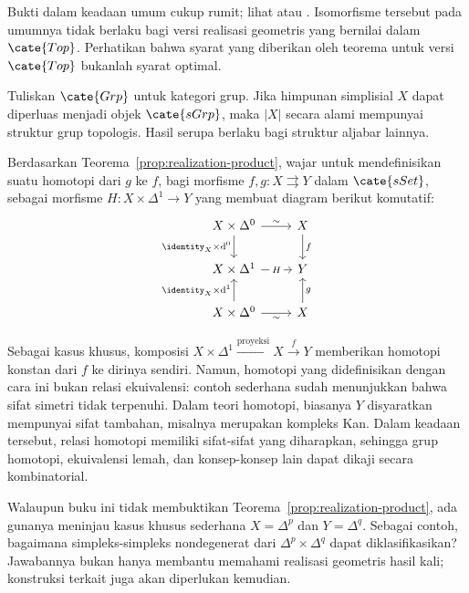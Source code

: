 Bukti dalam keadaan umum cukup rumit; lihat \cite[Bab III]{GZ67} atau
\cite{Dri03}. Isomorfisme tersebut pada umumnya tidak berlaku bagi versi
realisasi geometris yang bernilai dalam $\cate{Top}$. Perhatikan bahwa syarat
yang diberikan oleh teorema untuk versi $\cate{Top}$ bukanlah syarat optimal.

\begin{corollary}
	Tuliskan $\cate{Grp}$ untuk kategori grup. Jika himpunan simplisial $X$
	dapat diperluas menjadi objek $\cate{sGrp}$, maka $|X|$ secara alami
	mempunyai struktur grup topologis. Hasil serupa berlaku bagi struktur
	aljabar lainnya.
\end{corollary}

Berdasarkan Teorema~\ref{prop:realization-product}, wajar untuk mendefinisikan
suatu homotopi dari $g$ ke $f$, bagi morfisme
$f,g:X\rightrightarrows Y$ dalam $\cate{sSet}$, sebagai morfisme
$H:X\times\Delta^1\to Y$ yang membuat diagram berikut komutatif:
\begin{equation}\label{eqn:simplicial-homotopy-prep}
	\begin{tikzcd}
		X \times \Delta^0 \arrow[d, "{\identity_X \times \mathrm{d}^0}"'] \arrow[r, "\sim"] & X \arrow[d, "f"] \\
		X \times \Delta^1 \arrow[r, "H" description] & Y \\
		X \times \Delta^0 \arrow[u, "{\identity_X \times \mathrm{d}^1}"] \arrow[r, "\sim"'] & X \arrow[u, "g"']
	\end{tikzcd}
\end{equation}

Sebagai kasus khusus, komposisi
$X\times\Delta^1\xrightarrow{\text{proyeksi}}X\xrightarrow{f}Y$
memberikan homotopi konstan dari $f$ ke dirinya sendiri. Namun, homotopi yang
didefinisikan dengan cara ini bukan relasi ekuivalensi: contoh sederhana
sudah menunjukkan bahwa sifat simetri tidak terpenuhi. Dalam teori homotopi,
biasanya $Y$ disyaratkan mempunyai sifat tambahan, misalnya merupakan
kompleks Kan. Dalam keadaan tersebut, relasi homotopi memiliki
sifat-sifat yang diharapkan, sehingga grup homotopi, ekuivalensi lemah, dan
konsep-konsep lain dapat dikaji secara kombinatorial.

Walaupun buku ini tidak membuktikan
Teorema~\ref{prop:realization-product}, ada gunanya meninjau kasus khusus
sederhana $X=\Delta^p$ dan $Y=\Delta^q$. Sebagai contoh,
bagaimana simpleks-simpleks nondegenerat dari
$\Delta^p\times\Delta^q$ dapat diklasifikasikan? Jawabannya bukan hanya
membantu memahami realisasi geometris hasil kali; konstruksi terkait juga
akan diperlukan kemudian.

